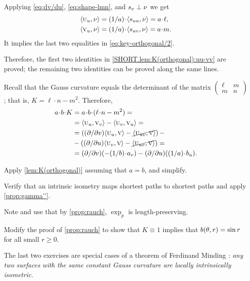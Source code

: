 Applying \ref{eq:dv/du}, \ref{eq:shape-lmn}, and $s_v\perp\nu$ we get
\begin{align*}
\langle\vec u_u,\Norm\rangle
&=
\tfrac1{a}\cdot \langle s_{uu},\Norm\rangle
=a\cdot \ell,
\\
\langle\vec v_u,\Norm\rangle
&=
\tfrac1{a}\cdot \langle s_{uv},\Norm\rangle
=a\cdot m.
\end{align*}
It implies the last two equalities in \ref{eq:key-orthogonal/2}.

Therefore, the first two identities in \ref{SHORT.lem:K(orthogonal):uu-vv} are proved;
the remaining two identities can be proved along the same lines.

Recall that the Gauss curvature equals the determinant of the matrix $
(\begin{smallmatrix}
\ell&m
\\
m&n
\end{smallmatrix}
)
$;
that is, $K=\ell\cdot n-m^2$.
Therefore, 
\begin{align*}
a\cdot b\cdot K
&=
a\cdot b\cdot(\ell\cdot n-m^2)
=
\\
&=
\langle\vec u_u,\vec v_v\rangle 
-
\langle\vec u_v,\vec v_u\rangle= 
\\
&= 
\left(
\tfrac{\partial}{\partial v}
\langle\vec u_u,\vec v\rangle
-
\cancel{\langle\vec u_{uv},\vec v\rangle}
\right)-
\\
&-
\left(
\tfrac{\partial}{\partial u}
\langle\vec u_v,\vec v\rangle
-
\cancel{\langle\vec u_{uv},\vec v\rangle}
\right)=
\\
&=\tfrac{\partial}{\partial v}(-\tfrac1{b}\cdot a_v)
-
\tfrac{\partial}{\partial u}(\tfrac1{a}\cdot b_u).
\end{align*}

Apply \ref{lem:K(orthogonal)} assuming that $a=b$, and simplify.

Verify that an intrinsic isometry maps shortest paths to shortest paths and apply \ref{prop:gamma''}.

Note and use that by \ref{prop:rauch}, $\exp_p$ is length-preserving.

Modify the proof of \ref{prop:rauch} to show that $K\equiv 1$ implies that $b(\theta,r)\z=\sin r$ for all small $r\ge 0$.

The last two exercises are special cases of a theorem of Ferdinand Minding \cite{minding}: \textit{any two surfaces with the same constant Gauss curvature are locally intrinsically isometric}.

